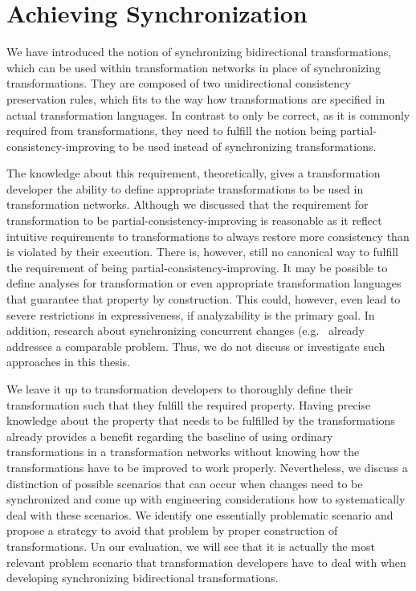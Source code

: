 \section{Achieving Synchronization} %
\label{chap:synchronization:achieving}

We have introduced the notion of synchronizing bidirectional transformations, which can be used within transformation networks in place of synchronizing transformations.
They are composed of two unidirectional consistency preservation rules, which fits to the way how transformations are specified in actual transformation languages.
In contrast to only be correct, as it is commonly required from transformations, they need to fulfill the notion being partial-consistency-improving to be used instead of synchronizing transformations.

The knowledge about this requirement, theoretically, gives a transformation developer the ability to define appropriate transformations to be used in transformation networks.
Although we discussed that the requirement for transformation to be partial-consistency-improving is reasonable as it reflect intuitive requirements to transformations to always restore more consistency than is violated by their execution.
There is, however, still no canonical way to fulfill the requirement of being partial-consistency-improving.
It may be possible to define analyses for transformation or even appropriate transformation languages that guarantee that property by construction.
This could, however, even lead to severe restrictions in expressiveness, if analyzability is the primary goal.
In addition, research about synchronizing concurrent changes (e.g.~\cite{hermann2012concurrentSynchronization-FASE,orejas2020IncrementalConcurrentSynchronization-FASE,xiong2013SynchronizingConcurrentUpdates-SoSym,xiong2009parallelUpdates-ICMT} already addresses a comparable problem.
Thus, we do not discuss or investigate such approaches in this thesis.

We leave it up to transformation developers to thoroughly define their transformation such that they fulfill the required property.
Having precise knowledge about the property that needs to be fulfilled by the transformations already provides a benefit regarding the baseline of using ordinary transformations in a transformation networks without knowing how the transformations have to be improved to work properly.
Nevertheless, we discuss a distinction of possible scenarios that can occur when changes need to be synchronized and come up with engineering considerations how to systematically deal with these scenarios.
We identify one essentially problematic scenario and propose a strategy to avoid that problem by proper construction of transformations.
Un our evaluation, we will see that it is actually the most relevant problem scenario that transformation developers have to deal with when developing synchronizing bidirectional transformations.

